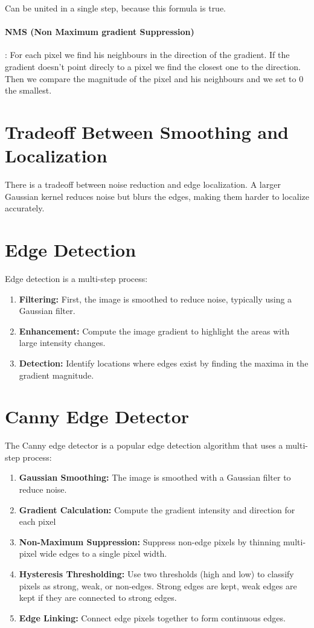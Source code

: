 Can be united in a single step,
because this formula is true.





\paragraph*{NMS (Non Maximum gradient Suppression)}: For each pixel we find his neighbours
in the direction of the gradient. If the gradient doesn't point direcly to a pixel
we find the closest one to the direction.
Then we compare the magnitude of the pixel and his neighbours and we set to 0 the
smallest.

\section{Tradeoff Between Smoothing and Localization}
There is a tradeoff between noise reduction and edge localization. A larger Gaussian kernel reduces noise but blurs the edges, making them harder to localize accurately.

\section{Edge Detection}
Edge detection is a multi-step process:
\begin{enumerate}
    \item \textbf{Filtering:} First, the image is smoothed to reduce noise, typically using a Gaussian filter.
    \item \textbf{Enhancement:} Compute the image gradient to highlight the areas with large intensity changes.
    \item \textbf{Detection:} Identify locations where edges exist by finding the maxima in the gradient magnitude.
\end{enumerate}

\section{Canny Edge Detector}
The Canny edge detector is a popular edge detection algorithm that uses a multi-step process:
\begin{enumerate}
    \item \textbf{Gaussian Smoothing:} The image is smoothed with a Gaussian filter
          to reduce noise.
    \item \textbf{Gradient Calculation:} Compute the gradient intensity and direction
          for each pixel
    \item \textbf{Non-Maximum Suppression:} Suppress non-edge pixels by thinning
          multi-pixel wide edges to a single pixel width.
    \item \textbf{Hysteresis Thresholding:} Use two thresholds (high and low) to
          classify pixels as strong, weak, or non-edges. Strong edges are kept, weak
          edges are kept if they are connected to strong edges.
    \item \textbf{Edge Linking:} Connect edge pixels together to form continuous
          edges.
\end{enumerate}
